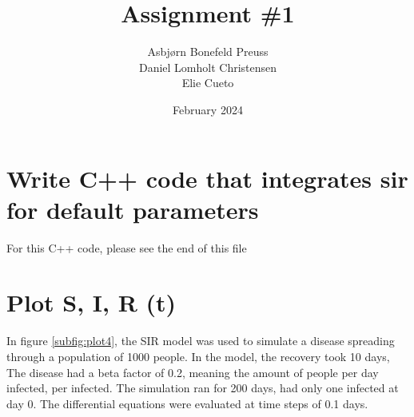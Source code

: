 \documentclass{article}
\title{Assignment \#1}
\author{Asbjørn Bonefeld Preuss\\ Daniel Lomholt Christensen \\ Elie Cueto}
\date{February 2024}
\begin{document}
\maketitle
\section*{Write C++ code that integrates sir for default parameters}
For this C++ code, please see the end of this file
\section*{Plot S, I, R (t)}
In figure \ref{subfig:plot4}, the SIR model was used to simulate a disease spreading through a population of 1000 people. In the model, the recovery took 10 days, The disease had a beta factor of 0.2, meaning the amount of people per day infected, per infected. The simulation ran for 200 days, had only one infected at day 0. The differential equations were evaluated at time steps of 0.1 days.
\end{document}
